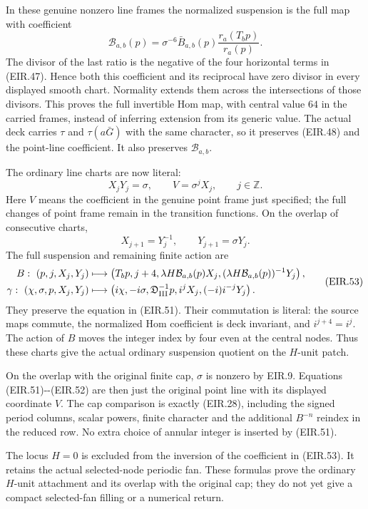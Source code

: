 In these genuine nonzero line frames the normalized suspension is
the full map with coefficient
\[
 \mathcal B_{a,b}(p)
   =\sigma^{-6}\bar B_{a,b}(p)
       \frac{r_a(T_b p)}{r_a(p)} .
 \tag{EIR.50}
\]
The divisor of the last ratio is the negative of the four
horizontal terms in (EIR.47). Hence both this coefficient and its
reciprocal have zero divisor in every displayed smooth chart.
Normality extends them across the intersections of those divisors.
This proves the full invertible Hom map, with central value \(64\)
in the carried frames, instead of inferring extension from its
generic value. The actual deck carries \(\tau\) and
\(\tau(a\bar G)\) with the same character, so it preserves
(EIR.48) and the point-line coefficient. It also preserves
\(\mathcal B_{a,b}\).

The ordinary line charts are now literal:
\[
 X_jY_j=\sigma,\qquad V=\sigma^jX_j,\qquad j\in\mathbb Z.
 \tag{EIR.51}
\]
Here \(V\) means the coefficient in the genuine point frame just
specified; the full changes of point frame remain in the
transition functions. On the overlap of consecutive charts,
\[
 X_{j+1}=Y_j^{-1},\qquad Y_{j+1}=\sigma Y_j.
 \tag{EIR.52}
\]
The full suspension and remaining finite action are
\[
 \begin{aligned}
 B:\ (p,j,X_j,Y_j)&\longmapsto
 \left(T_bp,j+4,\lambda H\mathcal B_{a,b}(p)X_j,
       (\lambda H\mathcal B_{a,b}(p))^{-1}Y_j\right),\\
 \gamma:\ (\chi,\sigma,p,X_j,Y_j)&\longmapsto
 \left(i\chi,-i\sigma,\mathfrak D_{\rm III}^{-1}p,
                  i^jX_j,(-i)i^{-j}Y_j\right).
 \end{aligned}
 \tag{EIR.53}
\]
They preserve the equation in (EIR.51). Their commutation is
literal: the source maps commute, the normalized Hom coefficient
is deck invariant, and \(i^{j+4}=i^j\). The action of \(B\) moves
the integer index by four even at the central nodes. Thus these
charts give the actual ordinary suspension quotient on the
\(H\)-unit patch.

On the overlap with the original finite cap, \(\sigma\) is
nonzero by EIR.9. Equations (EIR.51)-\/-(EIR.52) are then just
the original point line with its displayed coordinate \(V\).
The cap comparison is exactly (EIR.28), including the signed
period columns, scalar powers, finite character and the
additional \(B^{-n}\) reindex in the reduced row. No extra
choice of annular integer is inserted by (EIR.51).

The locus \(H=0\) is excluded from the inversion of the coefficient
in (EIR.53). It retains the actual selected-node periodic fan.
These formulas prove the ordinary \(H\)-unit attachment and its
overlap with the original cap; they do not yet give a compact
selected-fan filling or a numerical return.

